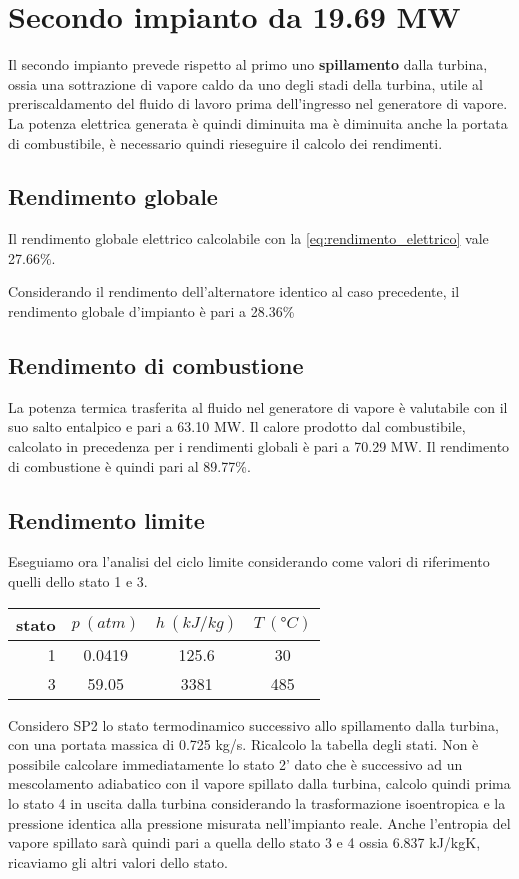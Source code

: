 \section{Secondo impianto da 19.69 MW}
Il secondo impianto prevede rispetto al primo uno \textbf{spillamento} dalla turbina, ossia una sottrazione di vapore caldo da uno degli stadi della turbina, 
utile al preriscaldamento del fluido di lavoro prima dell'ingresso nel generatore di vapore.
La potenza elettrica generata è quindi diminuita ma è diminuita anche la portata di combustibile, è necessario quindi rieseguire il calcolo dei rendimenti.
\subsection{Rendimento globale}
Il rendimento globale elettrico calcolabile con la \eqref{eq:rendimento_elettrico} vale 27.66\%.

Considerando il rendimento dell'alternatore identico al caso precedente, il rendimento globale d'impianto è pari a 28.36\%
\subsection{Rendimento di combustione}
La potenza termica trasferita al fluido nel generatore di vapore è valutabile con il suo salto entalpico e pari a 63.10 MW.
Il calore prodotto dal combustibile, calcolato in precedenza per i rendimenti globali è pari a 70.29 MW.
Il rendimento di combustione è quindi pari al 89.77\%.

\subsection{Rendimento limite}
Eseguiamo ora l'analisi del ciclo limite considerando come valori di riferimento quelli dello stato 1 e 3.
\begin{center}
    \begin{tabular}{r|c|c|c}
        stato    & $p\ (atm)$ & $h\ (kJ/kg)$ & $T\ (\text{°}C) $\\ \hline
        1   &        0.0419 &          125.6   &           30     \\ \hline
        3   &        59.05  &           3381   &           485
    \end{tabular}
\end{center}
Considero SP2 lo stato termodinamico successivo allo spillamento dalla turbina, con una portata massica di 0.725 kg/s. Ricalcolo la tabella degli stati.
Non è possibile calcolare immediatamente lo stato 2' dato che è successivo ad un mescolamento adiabatico con il vapore spillato dalla turbina, calcolo quindi prima
lo stato 4 in uscita dalla turbina considerando la trasformazione isoentropica e la pressione identica alla pressione misurata nell'impianto reale.
Anche l'entropia del vapore spillato sarà quindi pari a quella dello stato 3 e 4 ossia 6.837 kJ/kgK, ricaviamo gli altri valori dello stato.

